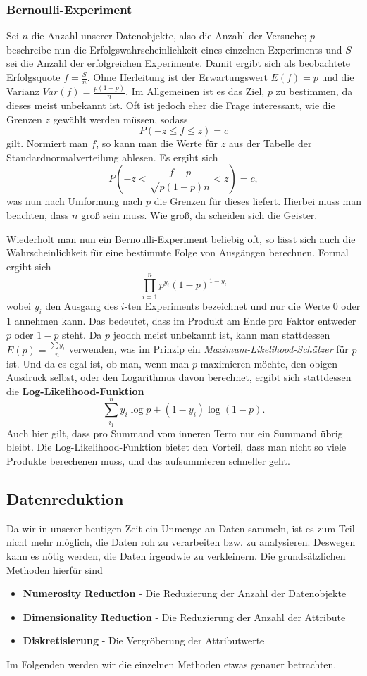 \subsubsection{Bernoulli-Experiment}
Sei \(n\) die Anzahl unserer Datenobjekte,
also die Anzahl der Versuche; \(p\) beschreibe nun die Erfolgswahrscheinlichkeit
eines einzelnen Experiments und \(S\) sei die Anzahl der erfolgreichen Experimente.
Damit ergibt sich als beobachtete Erfolgsquote \(f=\frac{S}{n}\). Ohne
Herleitung ist der Erwartungswert \(E(f) = p\) und die Varianz \(Var(f)= \frac{p(1-p)}{n}\).
Im Allgemeinen ist es das Ziel, \(p\) zu bestimmen, da dieses meist unbekannt ist.
Oft ist jedoch eher die Frage interessant, wie die Grenzen \(z\) gewählt werden
müssen, sodass 
\[
	P(-z \leq f \leq z) = c
\]
gilt. Normiert man \(f\), so kann man die Werte für \(z\) aus der Tabelle
der Standardnormalverteilung ablesen. Es ergibt sich
\[
	P(-z < \frac{f-p}{\sqrt{p(1-p)n}} < z) = c ,
\]
was nun nach Umformung nach \(p\) die Grenzen für dieses liefert. Hierbei
muss man beachten, dass \(n\) groß sein muss. Wie groß, da scheiden sich
die Geister.

Wiederholt man nun ein Bernoulli-Experiment beliebig oft, so lässt sich auch
die Wahrscheinlichkeit für eine bestimmte Folge von Ausgängen berechnen. Formal
ergibt sich
\[
	\prod\limits_{i=1}^{n} p^{y_i} (1-p)^{1-y_i}
\]
wobei \(y_i\) den Ausgang des \(i\)-ten Experiments bezeichnet und nur die Werte
\(0\) oder \(1\) annehmen kann. Das bedeutet, dass im Produkt am Ende pro Faktor
entweder \(p\) oder \(1-p\) steht. Da \(p\) jeodch meist unbekannt ist, kann man
stattdessen \(E(p) = \frac{\sum y_i}{n}\) verwenden, was im Prinzip ein 
\textit{Maximum-Likelihood-Schätzer} für \(p\) ist. Und da es egal ist, ob man,
wenn man \(p\) maximieren möchte, den obigen Ausdruck selbst, oder den Logarithmus
davon berechnet, ergibt sich stattdessen die \textbf{Log-Likelihood-Funktion}
\[
	\sum\limits_{i_1}^n y_i \log{p} + (1-y_i)\log(1-p).
\]
Auch hier gilt, dass pro Summand vom inneren Term nur ein Summand übrig bleibt.
Die Log-Likelihood-Funktion bietet den Vorteil, dass man nicht so viele Produkte
berechenen muss, und das aufsummieren schneller geht.


\subsection{Datenreduktion}
Da wir in unserer heutigen Zeit ein Unmenge an Daten sammeln, ist es zum Teil nicht
mehr möglich, die Daten roh zu verarbeiten bzw. zu analysieren. Deswegen kann es
nötig werden, die Daten irgendwie zu verkleinern. Die grundsätzlichen Methoden
hierfür sind
\begin{itemize}
	\item \textbf{Numerosity Reduction} - Die Reduzierung der Anzahl der Datenobjekte
	\item \textbf{Dimensionality Reduction} - Die Reduzierung der Anzahl der Attribute
	\item \textbf{Diskretisierung} - Die Vergröberung der Attributwerte
\end{itemize}
Im Folgenden werden wir die einzelnen Methoden etwas genauer betrachten.

